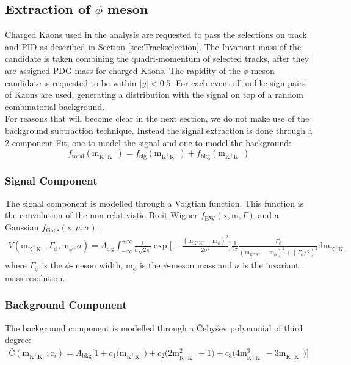 \subsection{Extraction of $\phi$ meson}
Charged Kaons used in the analysis are requested to pass the selections on track and PID as described in Section \ref{sec:Trackselection}. The Invariant mass of the candidate is taken combining the quadri-momentum of selected tracks, after they are assigned PDG mass for charged Kaons. The rapidity of the $\phi$-meson candidate is requested to be within $|y| < 0.5$. For each event all unlike sign pairs of Kaons are used, generating a distribution with the signal on top of a random combinatorial background.\\
\indent For reasons that will become clear in the next section, we do not make use of the background subtraction technique. Instead the signal extraction is done through a 2-component Fit, one to model the signal and one to model the background:
\begin{equation}
f_{\text{total}}(\text{m}_{\text{K}^+\text{K}^-}) = f_{\text{sig}}(\text{m}_{\text{K}^+\text{K}^-}) + f_{\text{bkg}}(\text{m}_{\text{K}^+\text{K}^-})
\end{equation}
\subsubsection{Signal Component} The signal component is modelled through a Voigtian function. This function is the convolution of the non-relativistic Breit-Wigner $f_{\text{BW}}(\text{x},\text{m},\Gamma)$ and a Gaussian $f_{\text{Gaus}}(\text{x},\mu,\sigma)$:
\begin{eqnarray}
V(\text{m}_{\text{K}^+\text{K}^-};\Gamma_{\phi},\text{m}_{\phi},\sigma) = A_{\text{sig}}\int_{-\infty}^{+\infty}\frac{1}{\sigma\sqrt{2\pi}}\exp{\Big[ -\frac{(\text{m}_{\text{K}^+\text{K}^-}-\text{m}_{\phi})^2}{2\sigma^2} \Big]}\frac{1}{2\pi}\frac{\Gamma_{\phi}}{(\text{m}_{\text{K}^+\text{K}^-}-\text{m}_{\phi})^2+(\Gamma_{\phi}/2)^2}\text{d}\text{m}_{\text{K}^+\text{K}^-}
\end{eqnarray}
where $\Gamma_{\phi}$ is the $\phi$-meson width, $\text{m}_{\phi}$ is the $\phi$-meson mass and $\sigma$ is the invariant mass resolution.
\subsubsection{Background Component} The background component is modelled through a \v{C}eby\v{s}\"{e}v polynomial of third degree:
\begin{eqnarray}
\text{\v{C}}(\text{m}_{\text{K}^+\text{K}^-};\text{c}_i) = A_{\text{bkg}}\Big[1+ c_1\Big(\text{m}_{\text{K}^+\text{K}^-}\Big)+ c_2\Big(2\text{m}_{\text{K}^+\text{K}^-}^2-1\Big)+ c_3\Big(4\text{m}_{\text{K}^+\text{K}^-}^3-3\text{m}_{\text{K}^+\text{K}^-}\Big)\Big]
\end{eqnarray}

